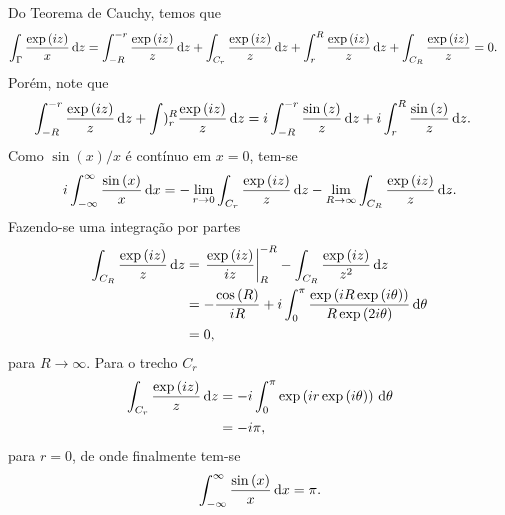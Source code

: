\documentclass[a4paper,12pt, leqno, answers]{exam}
\begin{document}
\begin{questions}
\begin{solution}
        Do Teorema de Cauchy, temos que
        \begin{align*}
            \int_\Gamma \frac{\exp\left( i z \right)}{x} \, \mathrm{d}z &= \int_{-R}^{-r} \frac{\exp\left( i z \right)}{z} \, \mathrm{d}z + \int_{C_r} \frac{\exp\left( i z \right)}{z} \, \mathrm{d}z + \int_r^R \frac{\exp\left( i z \right)}{z} \, \mathrm{d}z + \int_{C_R} \frac{\exp\left( i z \right)}{z} = 0.
        \end{align*}
        Por\'{e}m, note que
        \begin{align*}
            \int_{-R}^{-r} \frac{\exp\left( i z \right)}{z} \, \mathrm{d}z + \int)_r^R \frac{\exp\left( i z \right)}{z} \, \mathrm{d}z &= i \int_{-R}^{-r} \frac{\sin\left( z \right)}{z} \, \mathrm{d}z + i \int_r^R \frac{\sin\left( z \right)}{z} \, \mathrm{d}z.
        \end{align*}
        Como $\sin\left( x \right) / x$ \'{e} cont\'{i}nuo em $x = 0$, tem-se
        \begin{align*}
            i \int_{-\infty}^\infty \frac{\sin\left( x \right)}{x} \, \mathrm{d}x = - \lim_{r \to 0} \int_{C_r} \frac{\exp\left( i z \right)}{z} \, \mathrm{d}z - \lim_{R \to \infty} \int_{C_R} \frac{\exp\left( i z \right)}{z} \, \mathrm{d}z.
        \end{align*}
        Fazendo-se uma integra\c{c}\~{a}o por partes
        \begin{align*}
            \int_{C_R} \frac{\exp\left( i z \right)}{z} \, \mathrm{d}z &= \left. \frac{\exp\left( i z \right)}{i z} \right|_R^{-R} - \int_{C_R} \frac{\exp\left( i z \right)}{z^2} \, \mathrm{d}z \\
            &= - \frac{\cos\left( R \right)}{i R} + i \int_0^\pi \frac{\exp\left( i R \exp\left( i \theta \right) \right)}{R \exp\left( 2 i \theta \right)} \, \mathrm{d}\theta \\
            &= 0,
        \end{align*}
        para $R \to \infty$. Para o trecho $C_r$
        \begin{align*}
            \int_{C_r} \frac{\exp\left( i z \right)}{z} \, \mathrm{d}z &= - i \int_0^\pi \exp\left( i r \exp\left( i \theta \right) \right) \, \mathrm{d}\theta \\
            &= - i \pi,
        \end{align*}
        para $r = 0$, de onde finalmente tem-se
        \begin{align*}
            \int_{-\infty}^\infty \frac{\sin\left( x \right)}{x} \, \mathrm{d}x = \pi.
        \end{align*}
    \end{solution}


\end{questions}
\end{document}
